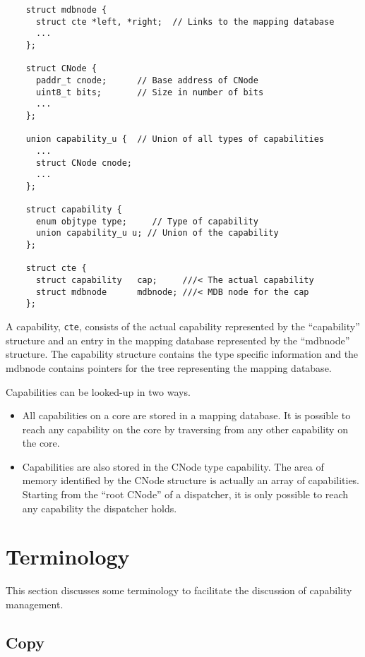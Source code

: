 \documentclass[a4paper,twoside]{report} %
\begin{document}
{\scriptsize
\begin{verbatim}
    struct mdbnode {
      struct cte *left, *right;  // Links to the mapping database
	  ...
    };

    struct CNode {
      paddr_t cnode;      // Base address of CNode
      uint8_t bits;       // Size in number of bits
      ...
    };

    union capability_u {  // Union of all types of capabilities
      ...
      struct CNode cnode;
      ...
    };

    struct capability {
      enum objtype type;     // Type of capability
      union capability_u u; // Union of the capability
    };

    struct cte {
      struct capability   cap;     ///< The actual capability
      struct mdbnode      mdbnode; ///< MDB node for the cap
    };
\end{verbatim}
}

A capability, \verb|cte|, consists of the actual capability represented by the
``capability'' structure and an entry in the mapping database represented by
the ``mdbnode'' structure. The capability structure contains the type specific
information and the mdbnode contains pointers for the tree representing the
mapping database.

Capabilities can be looked-up in two ways.
\begin{itemize}
\item All capabilities on a core are stored in a mapping database. It
  is possible to reach any capability on the core by traversing from
  any other capability on the core.

\item Capabilities are also stored in the CNode type capability. The
  area of memory identified by the CNode structure is actually an
  array of capabilities. Starting from the ``root CNode'' of a
  dispatcher, it is only possible to reach any capability the
  dispatcher holds.
\end{itemize}

\section{Terminology}

This section discusses some terminology to facilitate the discussion
of capability management.

\subsection{Copy}
\end{document}
